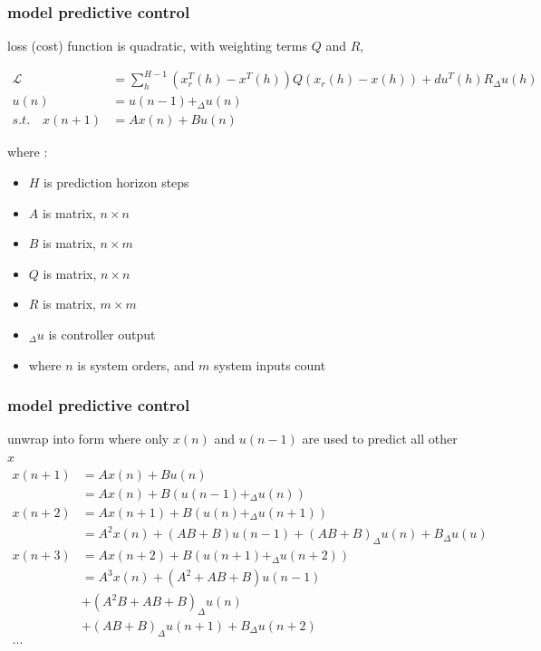 \documentclass{beamer}
\begin{document}
\begin{frame}
  
  \frametitle{\bf model predictive control}

  loss (cost) function is quadratic, with weighting terms $Q$ and $R$,

  \begin{align*}
    \mathcal{L} &=\sum_h^{H-1} (x_r^T(h) - x^T(h)) Q (x_r(h) - x(h)) + du^T(h) R _\Delta u(h) \\
    u(n) & = u(n-1) + _\Delta u(n) \\
    s.t. \quad x(n+1) &= Ax(n) + Bu(n) 
  \end{align*}  

  where : 
  \begin{itemize}
    \item $H$ is prediction horizon steps
    \item $A$ is matrix, $n \times n$
    \item $B$ is matrix, $n \times m$
    \item $Q$ is matrix, $n \times n$
    \item $R$ is matrix, $m \times m$
    \item $_\Delta u$ is controller output
    \item where $n$ is system orders, and $m$ system inputs count
  \end{itemize}

  
\end{frame}


\begin{frame}
  
  \frametitle{\bf model predictive control}
  unwrap into form where only $x(n)$ and $u(n-1)$ are used to predict all other $x$
  \begin{align*}
    x(n+1)&= Ax(n) + Bu(n) \\
          &= Ax(n) + B(u(n-1) + _\Delta u(n)) \\
    x(n+2)&= Ax(n+1) + B(u(n) + _\Delta u(n+1)) \\
          &= A^2x(n) + (AB + B)u(n-1) + (AB+B)_\Delta u(n) + B_\Delta u(u) \\
    x(n+3)&= Ax(n+2) + B(u(n+1) + _\Delta u(n+2)) \\
          &= A^3x(n) + (A^2 + AB + B)u(n-1) \\
          & + (A^2B + AB + B)_\Delta u(n) \\
          & + (AB + B)_\Delta u(n+1) + B_\Delta u(n+2) \\
    ... 
  \end{align*}  

  
\end{frame}
\end{document}
